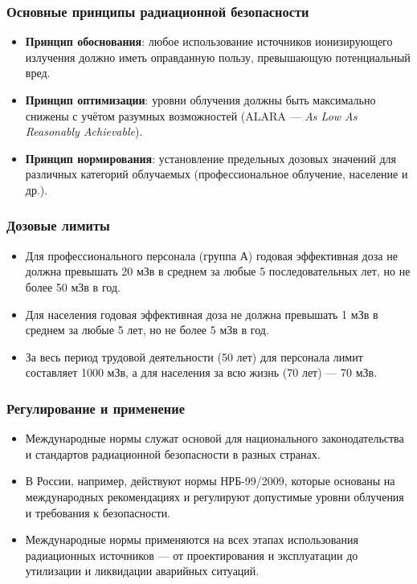 \documentclass[a4paper, 14pt]{extarticle}
\begin{document}
\subsubsection*{Основные принципы радиационной безопасности}

\begin{itemize}
    \item \textbf{Принцип обоснования}: любое использование источников ионизирующего излучения должно иметь оправданную пользу, превышающую потенциальный вред.
    \item \textbf{Принцип оптимизации}: уровни облучения должны быть максимально снижены с учётом разумных возможностей (ALARA --- \textit{As Low As Reasonably Achievable}).
    \item \textbf{Принцип нормирования}: установление предельных дозовых значений для различных категорий облучаемых (профессиональное облучение, население и др.).
\end{itemize}

\subsubsection*{Дозовые лимиты}

\begin{itemize}
    \item Для профессионального персонала (группа А) годовая эффективная доза не должна превышать 20 мЗв в среднем за любые 5 последовательных лет, но не более 50 мЗв в год.
    \item Для населения годовая эффективная доза не должна превышать 1 мЗв в среднем за любые 5 лет, но не более 5 мЗв в год.
    \item За весь период трудовой деятельности (50 лет) для персонала лимит составляет 1000 мЗв, а для населения за всю жизнь (70 лет) --- 70 мЗв.
\end{itemize}

\subsubsection*{Регулирование и применение}

\begin{itemize}
    \item Международные нормы служат основой для национального законодательства и стандартов радиационной безопасности в разных странах.
    \item В России, например, действуют нормы НРБ-99/2009, которые основаны на международных рекомендациях и регулируют допустимые уровни облучения и требования к безопасности.
    \item Международные нормы применяются на всех этапах использования радиационных источников --- от проектирования и эксплуатации до утилизации и ликвидации аварийных ситуаций.
\end{itemize}
\end{document}
